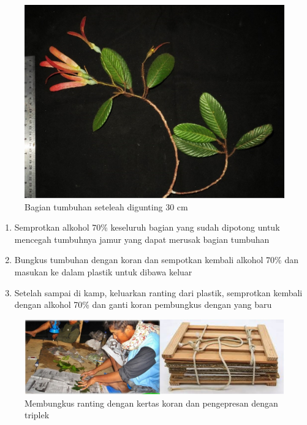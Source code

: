 \documentclass[
  oneside]{book}
\begin{document}
\begin{figure}

{\centering \includegraphics[width=1\linewidth]{images/ranting} 

}

\caption{Bagian tumbuhan seteleah digunting 30 cm}\label{fig:ranting}
\end{figure}

\begin{enumerate}
\def\labelenumi{\arabic{enumi}.}
\setcounter{enumi}{1}
\item
  Semprotkan alkohol 70\% keseluruh bagian yang sudah dipotong untuk mencegah tumbuhnya jamur yang dapat merusak bagian tumbuhan
\item
  Bungkus tumbuhan dengan koran dan sempotkan kembali alkohol 70\% dan masukan ke dalam plastik untuk dibawa keluar
\item
  Setelah sampai di kamp, keluarkan ranting dari plastik, semprotkan kembali dengan alkohol 70\% dan ganti koran pembungkus dengan yang baru
\end{enumerate}

\begin{figure}

{\centering \includegraphics[width=1\linewidth]{images/preherba} 

}

\caption{Membungkus ranting dengan kertas koran dan pengepresan dengan triplek}\label{fig:preherba}
\end{figure}
\end{document}
